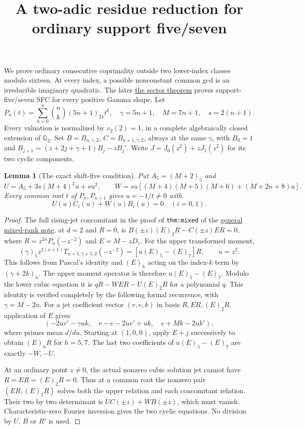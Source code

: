 \documentclass[11pt]{article}
\newtheorem{lemma}{Lemma}
\begin{document}
\setlength{\emergencystretch}{2em}
\title{A two-adic residue reduction for ordinary support five/seven}
\author{}\date{}\maketitle
We prove ordinary consecutive coprimality outside two lower-index
classes modulo sixteen. At every index, a possible nonconstant
common gcd is an irreducible imaginary quadratic.
The later \href{LOWER_FIVE_QUADRATIC_SECTOR_SFC.tex}{the sector theorem} proves support-five/seven SFC for every positive Gamma shape.
Let
\[
 P_n(t)=\sum_{k=0}^n\binom nk(5n+1)_{2k}t^k,\quad
 \gamma=5n+1,\quad M=7n+1,\quad s=2(n+1).
\]
Every valuation is normalized by $v_2(2)=1$, in a complete
algebraically closed extension of $\mathbb Q_2$.
Set $B=B_{n,\gamma,2}$, $C=B_{n+1,\gamma,2}$, always at the same
$\gamma$, with
$B_0=1$ and $B_{j+1}=(z+2j+\gamma+1)B_j-zB_j'$.
Write $J=J_0(z^2)+zJ_1(z^2)$ for its two cyclic components.

\begin{lemma}[The exact shift-five condition]\label{lem:shift}
Put $A_5=(M+2)_5$ and
\[
 U=A_5+3s(M+4)^2u+su^2,\qquad
 W=su[(M+4)(M+5)(M+6)+(M+2n+8)u].
\]
Every common root $t$ of $P_n,P_{n+1}$ gives
$u=-1/t\ne0$ with
\[
 U(u)C_i(u)+W(u)B_i(u)=0\quad(i=0,1).
\]
\end{lemma}
\begin{proof}
The full rising-jet concomitant in the proof of \texttt{thm:mixed}
of the \href{LOWER_TWO_PRIME_GAP_SFC.tex}{general mixed-rank note}, at $d=2$ and $R=0$,
is $B(\pm z)(E)_2R-C(\pm z)ER=0$, where
$R=z^{2n}P_n(-z^{-2})$ and $E=M-zD_z$.
For the upper transformed moment,
\[
 (\gamma)_5z^{2(n+1)}T_{n+1,\gamma+5,2}(-z^{-2})
              =[u(E)_5-(E)_7]R,\qquad u=z^2.
\]
This follows from Pascal's identity and
$(E)_h$ acting on the index-$k$ term by $(\gamma+2k)_h$.
The upper moment operator is therefore $u(E)_5-(E)_7$.
Modulo the lower cubic equation it is $qR-WER-U(E)_2R$
for a polynomial $q$. This identity is verified completely by
the following formal recurrence, with $\gamma=M-2n$.
For a jet coefficient vector $(r,e,k)$ in basis $R,ER,(E)_2R$,
application of $E$ gives
\[
 (-2ur'-\gamma uk,\quad r-e-2ue'+uk,\quad e+Mk-2uk'),
\]
where primes mean $d/du$. Starting at $(1,0,0)$, apply $E+j$
successively to obtain $(E)_hR$ for $h=5,7$.
The last two coefficients of $u(E)_5-(E)_7$ are exactly $-W,-U$.

At an ordinary point $z\ne0$, the actual nonzero cubic solution jet
cannot have $R=ER=(E)_2R=0$. Thus at a common root the nonzero
pair $(ER,(E)_2R)$ solves both the upper relation and each
concomitant relation. Their two by two determinant is
$UC(\pm z)+WB(\pm z)$, which must vanish.
Characteristic-zero Fourier inversion gives the two cyclic equations.
No division by $U$, $B$ or $R'$ is used.
\end{proof}
\end{document}
